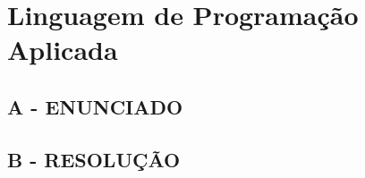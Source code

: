 \label{ap:ap02}
\chapter{Linguagem de Programação Aplicada}

\section*{\textbf{A - ENUNCIADO}}
\lipsum[30] 

\section*{\textbf{B - RESOLUÇÃO}}
\lipsum[30]